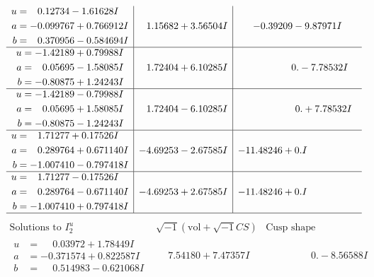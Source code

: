 \documentclass[1p]{elsarticle_modified}
\theoremstyle{definition}
\newcommand{\I}{\sqrt{-1}}
\begin{document}
$$\begin{array}{c|c|c}
\begin{aligned}
u &= \phantom{-}0.12734 - 1.61628 I \\
a &= -0.099767 + 0.766912 I \\
b &= \phantom{-}0.370956 - 0.584694 I\end{aligned}
 & \phantom{-}1.15682 + 3.56504 I & -0.39209 - 9.87971 I \\ \hline\begin{aligned}
u &= -1.42189 + 0.79988 I \\
a &= \phantom{-}0.05695 - 1.58085 I \\
b &= -0.80875 + 1.24243 I\end{aligned}
 & \phantom{-}1.72404 + 6.10285 I & \phantom{-0.000000 } 0. - 7.78532 I \\ \hline\begin{aligned}
u &= -1.42189 - 0.79988 I \\
a &= \phantom{-}0.05695 + 1.58085 I \\
b &= -0.80875 - 1.24243 I\end{aligned}
 & \phantom{-}1.72404 - 6.10285 I & \phantom{-0.000000 -}0. + 7.78532 I \\ \hline\begin{aligned}
u &= \phantom{-}1.71277 + 0.17526 I \\
a &= \phantom{-}0.289764 + 0.671140 I \\
b &= -1.007410 - 0.797418 I\end{aligned}
 & -4.69253 - 2.67585 I & -11.48246 + 0. I\phantom{ +0.000000I} \\ \hline\begin{aligned}
u &= \phantom{-}1.71277 - 0.17526 I \\
a &= \phantom{-}0.289764 - 0.671140 I \\
b &= -1.007410 + 0.797418 I\end{aligned}
 & -4.69253 + 2.67585 I & -11.48246 + 0. I\phantom{ +0.000000I}\\
 \hline 
 \end{array}$$\newpage$$\begin{array}{c|c|c}  
\text{Solutions to }I^u_{2}& \I (\text{vol} + \sqrt{-1}CS) & \text{Cusp shape}\\
 \hline 
\begin{aligned}
u &= \phantom{-}0.03972 + 1.78449 I \\
a &= -0.371574 + 0.822587 I \\
b &= \phantom{-}0.514983 - 0.621068 I\end{aligned}
 & \phantom{-}7.54180 + 7.47357 I & \phantom{-0.000000 } 0. - 8.56588 I \\ \hline\begin{aligned}

\end{aligned}
\end{array}$$
\end{document}
